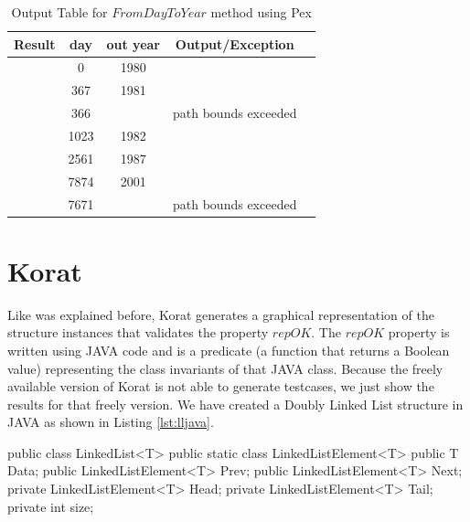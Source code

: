 \begin{code}
\begin{table}[!ht]
\renewcommand{\arraystretch}{1.3}
\centering
\noindent \begin{tabular}{|c|c|c|c|c|}\hline
\textbf{Result} & \textbf{day} & \textbf{out year} & \textbf{Output/Exception}\\\hline
\checkK & 0 & 1980 & \\\hline
\checkK & 367 & 1981 & \\\hline
\bigexclaim & 366 & & path bounds exceeded\\\hline
\checkK & 1023 & 1982 &\\\hline
\checkK & 2561 & 1987 & \\\hline
\checkK & 7874 & 2001 & \\\hline
\bigexclaim &  7671 & & path bounds exceeded\\\hline
\end{tabular}
\caption{Output Table for $FromDayToYear$ method using Pex}\label{tab:leap}
\end{table}

\section{Korat}
Like was explained before, Korat generates a graphical representation of the structure instances that validates the property $repOK$.
The $repOK$ property is written using JAVA code and is a predicate (a function that returns a Boolean value) representing the class invariants
of that JAVA class. Because the freely available version of Korat is not able to generate testcases, we just show the results for that freely version.
We have created a Doubly Linked List structure in JAVA as shown in Listing \ref{lst:lljava}.

\begin{code}[{LinkedList class in JAVA},label=lst:lljava]
public class LinkedList<T> {
  public static class LinkedListElement<T> {
    public T Data;
    public LinkedListElement<T> Prev;
    public LinkedListElement<T> Next;
  }
  private LinkedListElement<T> Head;
  private LinkedListElement<T> Tail;
  private int size; 
}
\end{code}

\def\t#1#2#3#4{\langle#1 \ #2 : #3 \ : #4 \ \rangle}
\def\d#1#2#3{\langle#1 \ #2 :: #3 \ \rangle}
\newcommand{\subseteqL}{\mathbin{\subseteq\mkern-4mu\subseteq}}
\newcommand{\inL}{\mathbin{\in\mkern-4mu\in}}


\end{code}
